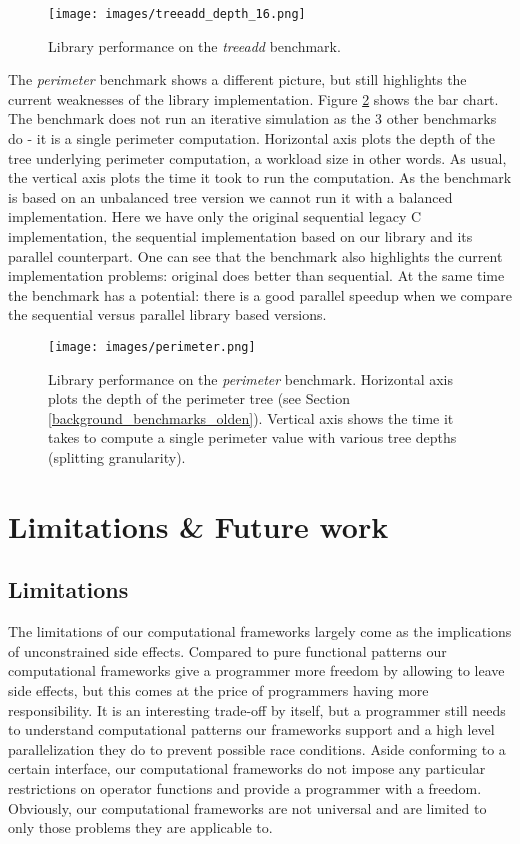 \begin{figure}[!htb]
\texttt{[image: images/treeadd\_depth\_16.png]}
\caption{Library performance on the \textit{treeadd} benchmark.}
\label{fig:performance_treeadd}
\end{figure}\newline\null
\quad The \textit{perimeter} benchmark shows a different picture, but still highlights the current weaknesses of the library implementation. Figure \ref{fig:performance_perimeter} shows the bar chart. The benchmark does not run an iterative simulation as the 3 other benchmarks do - it is a single perimeter computation. Horizontal axis plots the depth of the tree underlying perimeter computation, a workload size in other words. As usual, the vertical axis plots the time it took to run the computation. As the benchmark is based on an unbalanced tree version we cannot run it with a balanced implementation. Here we have only the original sequential legacy C implementation, the sequential implementation based on our library and its parallel counterpart. One can see that the benchmark also highlights the current implementation problems: original does better than sequential. At the same time the benchmark has a potential: there is a good parallel speedup when we compare the sequential versus parallel library based versions.
\begin{figure}[!htb]
\texttt{[image: images/perimeter.png]}
\caption{Library performance on the \textit{perimeter} benchmark. Horizontal axis plots the depth of the perimeter tree (see Section \ref{background_benchmarks_olden}). Vertical axis shows the time it takes to compute a single perimeter value with various tree depths (splitting granularity).}
\label{fig:performance_perimeter}
\end{figure}

\section{Limitations & Future work}
\label{frameworks_future_work}
\subsection{Limitations}
\label{frameworks_limitations}
\quad The limitations of our computational frameworks largely come as the implications of unconstrained side effects. Compared to pure functional patterns our computational frameworks give a programmer more freedom by allowing to leave side effects, but this comes at the price of programmers having more responsibility. It is an interesting trade-off by itself, but a programmer still needs to understand computational patterns our frameworks support and a high level parallelization they do to prevent possible race conditions. Aside conforming to a certain interface, our computational frameworks do not impose any particular restrictions on operator functions and provide a programmer with a freedom. Obviously, our computational frameworks are not universal and are limited to only those problems they are applicable to.
